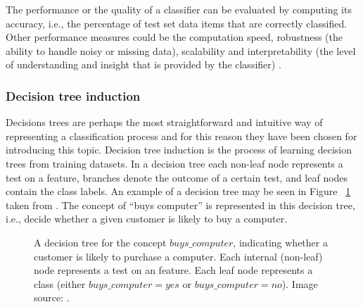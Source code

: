 The performance or the quality of a classifier can be evaluated by computing its accuracy, i.e., the percentage of test set data items that are correctly classified. Other performance measures could be the computation speed, robustness (the ability to handle noisy or missing data), scalability and interpretability (the level of understanding and insight that is provided by the classifier) \cite{Han06DataMining}.

\subsubsection{Decision tree induction}

Decisions trees are perhaps the most straightforward and intuitive way of representing a classification process and for this reason they have been chosen for introducing this topic.
Decision tree induction is the process of learning decision trees from training datasets. In a decision tree each non-leaf node represents a test on a feature,  branches denote the outcome of a certain  test,  and leaf nodes contain the class labels. An example of a decision tree may be seen in Figure ~\ref{fig:decisiontree} taken from \cite{Han06DataMining}. The concept of ``buys computer'' is represented in this decision tree, i.e., decide whether a given customer is likely to buy a computer. 

\begin{figure}[h!]
\centerline{}
      \caption[Decision tree]{A decision tree for the concept $buys\_computer$, indicating whether a customer is likely to purchase a computer. Each internal (non-leaf) node represents a test on an feature. Each leaf node represents a class (either $buys\_computer = yes$ or $buys\_computer = no$). Image source: \cite{Han06DataMining}.}
\label{fig:decisiontree}
\end{figure}


